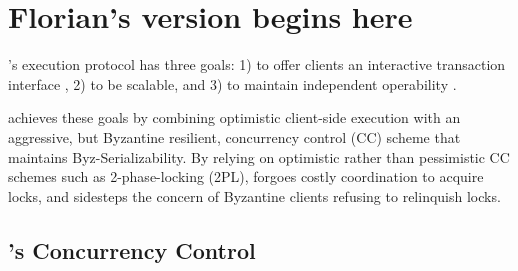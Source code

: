 \section{Florian's version begins here}


\sys{}'s execution protocol has three goals: 1) to offer clients an interactive transaction interface , 2) to be scalable, and 3) to maintain independent operability .

\sys{} achieves these goals by combining optimistic client-side execution with an aggressive, but Byzantine resilient, concurrency control (CC) scheme that maintains Byz-Serializability. 
By relying on optimistic rather than pessimistic CC schemes such as 2-phase-locking (2PL), \sys{} forgoes costly coordination to acquire locks, and sidesteps the concern of Byzantine clients refusing to relinquish locks.

\subsection{\sys{}'s Concurrency Control}

